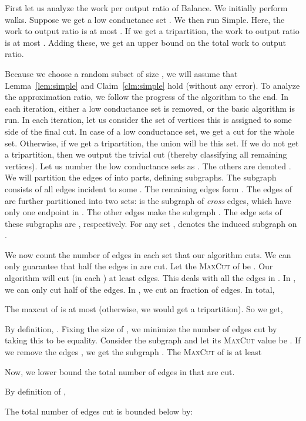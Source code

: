 \documentclass[11pt]{article}
\newenvironment{myproof}{\noindent {\sc Proof:}}{}
\newcommand\Balance{{\sc Balance}\xspace}
\newcommand\Simple{{\sc Simple}\xspace}
\def\maxcut{\textsc{MaxCut}\xspace}
\begin{document}
\begin{myproof} First let us analyze the work per output ratio of \Balance.
We initially perform  walks. Suppose we get a low
conductance set . We then run {\Simple}.
Here, the work to output ratio is at most .
If we get a tripartition, the work to output ratio
is at most . Adding these, we get an
upper bound on the total work to output ratio.

Because we choose a random subset  of size ,
we will assume that Lemma~\ref{lem:simple} and Claim~\ref{clm:simple}
hold (without any error).
To analyze the approximation ratio, we follow the progress of the algorithm
to the end. In each iteration, either a low conductance set is removed,
or the basic algorithm is run. In each iteration, let us consider
the set of vertices this is assigned to some side of the final cut.
In case of a low conductance set, we get a cut for the whole set.
Otherwise, if we get a tripartition, the union 
will be this set. If we do not get a tripartition,
then we output the trivial cut (thereby classifying all remaining vertices).
Let us number the low conductance sets
as . The others are denoted .
We will partition the edges of  into parts, defining subgraphs.
The subgraph  consists of all edges incident to some
. The remaining edges form . The
edges of  are further partitioned into two sets:
 is the subgraph of \emph{cross} edges, which have only
one endpoint in . The other edges make the subgraph .
The edge sets of these subgraphs are ,
respectively. For any set ,  denotes
the induced subgraph on .

We now count the number of edges
in each set that our algorithm cuts. We can only
guarantee that half the edges in  are cut. Let the
\maxcut of  be . Our algorithm will
cut (in each ) at least  edges.
This deals with all the edges in . In , we can
only cut half of the edges. In , we cut an 
fraction of edges. In total,

The maxcut of  is at most  (otherwise, we would
get a tripartition). So we get,


By definition, . Fixing the size
of , we minimize the number of edges cut by taking
this to be equality. Consider the subgraph  and let its
\maxcut value be . If we remove the edges ,
we get the subgraph . The \maxcut of  is at least

Now, we lower bound the total number of edges in  that are cut.

By definition of ,

The total number of edges cut is bounded below by:

\end{myproof}
\end{document}

